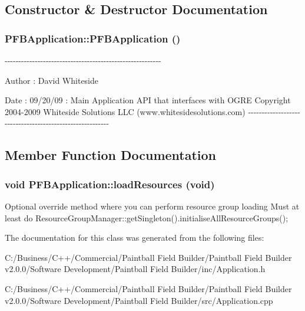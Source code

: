 \subsection{Constructor \& Destructor Documentation}
\hypertarget{class_p_f_b_application_a11ea35afe65eed12b9bae10f46ce14b7}{
\subsubsection[{PFBApplication}]{\setlength{\rightskip}{0pt plus 5cm}PFBApplication::PFBApplication ()}}
\label{class_p_f_b_application_a11ea35afe65eed12b9bae10f46ce14b7}
-\/-\/-\/-\/-\/-\/-\/-\/-\/-\/-\/-\/-\/-\/-\/-\/-\/-\/-\/-\/-\/-\/-\/-\/-\/-\/-\/-\/-\/-\/-\/-\/-\/-\/-\/-\/-\/-\/-\/-\/-\/-\/-\/-\/-\/-\/-\/-\/-\/-\/-\/-\/-\/-\/-\/-\/-\/ \begin{DoxyAuthor}{Author}
: David Whiteside 
\end{DoxyAuthor}
\begin{DoxyDate}{Date}
: 09/20/09 : Main Application API that interfaces with OGRE Copyright 2004-\/2009 Whiteside Solutions LLC (www.whitesidesolutions.com) -\/-\/-\/-\/-\/-\/-\/-\/-\/-\/-\/-\/-\/-\/-\/-\/-\/-\/-\/-\/-\/-\/-\/-\/-\/-\/-\/-\/-\/-\/-\/-\/-\/-\/-\/-\/-\/-\/-\/-\/-\/-\/-\/-\/-\/-\/-\/-\/-\/-\/-\/-\/-\/-\/-\/-\/-\/ 
\end{DoxyDate}


\subsection{Member Function Documentation}
\hypertarget{class_p_f_b_application_ac6f6f7f78b143d33e438be923fc9eac9}{
\subsubsection[{loadResources}]{\setlength{\rightskip}{0pt plus 5cm}void PFBApplication::loadResources (void)}}
\label{class_p_f_b_application_ac6f6f7f78b143d33e438be923fc9eac9}
Optional override method where you can perform resource group loading Must at least do ResourceGroupManager::getSingleton().initialiseAllResourceGroups(); 

The documentation for this class was generated from the following files:\begin{DoxyCompactItemize}
\item 
C:/Business/C++/Commercial/Paintball Field Builder/Paintball Field Builder v2.0.0/Software Development/Paintball Field Builder/inc/Application.h\item 
C:/Business/C++/Commercial/Paintball Field Builder/Paintball Field Builder v2.0.0/Software Development/Paintball Field Builder/src/Application.cpp\end{DoxyCompactItemize}
